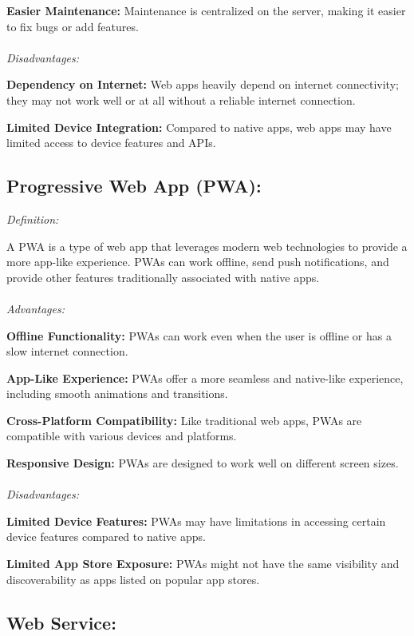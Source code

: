\documentclass[journal]{IEEEtran}
\begin{document}
    \textbf{Easier Maintenance:} Maintenance is centralized on the server, making it easier to fix bugs or add features.\\
\\\textit{Disadvantages:}

    \textbf{Dependency on Internet:} Web apps heavily depend on internet connectivity; they may not work well or at all without a reliable internet connection.
    
    \textbf{Limited Device Integration:} Compared to native apps, web apps may have limited access to device features and APIs.

\subsection{Progressive Web App (PWA):}

\textit{Definition:}

    A PWA is a type of web app that leverages modern web technologies to provide a more app-like experience. PWAs can work offline, send push notifications, and provide other features traditionally associated with native apps.\\
\\\textit{Advantages:}

    \textbf{Offline Functionality:} PWAs can work even when the user is offline or has a slow internet connection.
    
    \textbf{App-Like Experience:} PWAs offer a more seamless and native-like experience, including smooth animations and transitions.
    
    \textbf{Cross-Platform Compatibility:} Like traditional web apps, PWAs are compatible with various devices and platforms.
    
    \textbf{Responsive Design:} PWAs are designed to work well on different screen sizes.\\
\\\textit{Disadvantages:}

    \textbf{Limited Device Features:} PWAs may have limitations in accessing certain device features compared to native apps.
    
    \textbf{Limited App Store Exposure:} PWAs might not have the same visibility and discoverability as apps listed on popular app stores.

\subsection{Web Service:}
\end{document}
